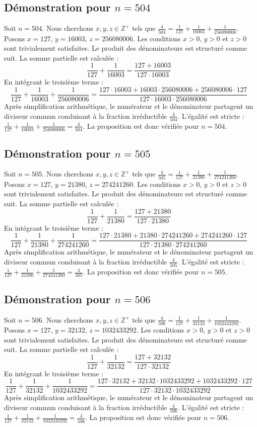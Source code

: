 \documentclass[11pt,a4paper]{article}
\begin{document}
\subsection{Démonstration pour $n = 504$}
Soit $n = 504$. Nous cherchons $x, y, z \in \mathbb{Z}^{+}$ tels que $\frac{4}{504} = \frac{1}{127} + \frac{1}{16003} + \frac{1}{256080006}$.
Posons $x = 127$, $y = 16003$, $z = 256080006$.
Les conditions $x > 0$, $y > 0$ et $z > 0$ sont trivialement satisfaites.
Le produit des dénominateurs est structuré comme suit. La somme partielle est calculée :
$$ \frac{1}{127} + \frac{1}{16003} = \frac{127+16003}{127 \cdot 16003} $$
En intégrant le troisième terme :
$$ \frac{1}{127} + \frac{1}{16003} + \frac{1}{256080006} = \frac{127 \cdot 16003 + 16003 \cdot 256080006 + 256080006 \cdot 127}{127 \cdot 16003 \cdot 256080006} $$
Après simplification arithmétique, le numérateur et le dénominateur partagent un diviseur commun conduisant à la fraction irréductible $\frac{4}{504}$.
L'égalité est stricte : $\frac{1}{127} + \frac{1}{16003} + \frac{1}{256080006} = \frac{4}{504}$.
La proposition est donc vérifiée pour $n = 504$.
\subsection{Démonstration pour $n = 505$}
Soit $n = 505$. Nous cherchons $x, y, z \in \mathbb{Z}^{+}$ tels que $\frac{4}{505} = \frac{1}{127} + \frac{1}{21380} + \frac{1}{274241260}$.
Posons $x = 127$, $y = 21380$, $z = 274241260$.
Les conditions $x > 0$, $y > 0$ et $z > 0$ sont trivialement satisfaites.
Le produit des dénominateurs est structuré comme suit. La somme partielle est calculée :
$$ \frac{1}{127} + \frac{1}{21380} = \frac{127+21380}{127 \cdot 21380} $$
En intégrant le troisième terme :
$$ \frac{1}{127} + \frac{1}{21380} + \frac{1}{274241260} = \frac{127 \cdot 21380 + 21380 \cdot 274241260 + 274241260 \cdot 127}{127 \cdot 21380 \cdot 274241260} $$
Après simplification arithmétique, le numérateur et le dénominateur partagent un diviseur commun conduisant à la fraction irréductible $\frac{4}{505}$.
L'égalité est stricte : $\frac{1}{127} + \frac{1}{21380} + \frac{1}{274241260} = \frac{4}{505}$.
La proposition est donc vérifiée pour $n = 505$.
\subsection{Démonstration pour $n = 506$}
Soit $n = 506$. Nous cherchons $x, y, z \in \mathbb{Z}^{+}$ tels que $\frac{4}{506} = \frac{1}{127} + \frac{1}{32132} + \frac{1}{1032433292}$.
Posons $x = 127$, $y = 32132$, $z = 1032433292$.
Les conditions $x > 0$, $y > 0$ et $z > 0$ sont trivialement satisfaites.
Le produit des dénominateurs est structuré comme suit. La somme partielle est calculée :
$$ \frac{1}{127} + \frac{1}{32132} = \frac{127+32132}{127 \cdot 32132} $$
En intégrant le troisième terme :
$$ \frac{1}{127} + \frac{1}{32132} + \frac{1}{1032433292} = \frac{127 \cdot 32132 + 32132 \cdot 1032433292 + 1032433292 \cdot 127}{127 \cdot 32132 \cdot 1032433292} $$
Après simplification arithmétique, le numérateur et le dénominateur partagent un diviseur commun conduisant à la fraction irréductible $\frac{4}{506}$.
L'égalité est stricte : $\frac{1}{127} + \frac{1}{32132} + \frac{1}{1032433292} = \frac{4}{506}$.
La proposition est donc vérifiée pour $n = 506$.
\end{document}
